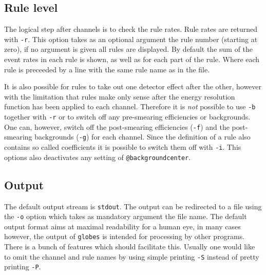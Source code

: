\subsection*{Rule level}

The logical step after channels is to check the rule rates. Rule rates 
are returned with {\tt -r}.
This option takes as an optional argument the rule number 
(starting at zero), if no argument is given all rules are displayed.
By default the sum of the event rates in each rule is shown, as well
as for each part of the rule. Where each 
rule is preceeded by a line with the same rule name as in the file. 

It is also possible for rules to take out one detector effect after 
the other, however with the limitation that rules make only sense
after the energy resolution function has been applied to each channel.
Therefore it is \emph{not} possible to use {\tt -b} together with {\tt -r} or
to switch off any pre-smearing efficiencies or backgrounds. 
One can, however, switch off the post-smearing efficiencies ({\tt -f}) 
and the post-smearing backgrounds ({\tt -g}) for each channel. Since
the definition of a rule also contains so called coefficients it is
possible to switch them off with {\tt -i}. This options also deactivates
any setting of {\tt @backgroundcenter}. 


\subsection*{Output}

The default output stream is {\tt stdout}. The output can be redirected to 
a file using the {\tt -o} option which takes as mandatory argument 
the file name. The default output format aims at maximal readability for
a human eye, in many cases however, the output of {\tt globes} is intended
for processing by other programs. There is a bunch of features which 
should facilitate this. Usually one would like to omit the channel and rule 
names by using simple printing {\tt -S} instead of pretty printing {\tt -P}.

